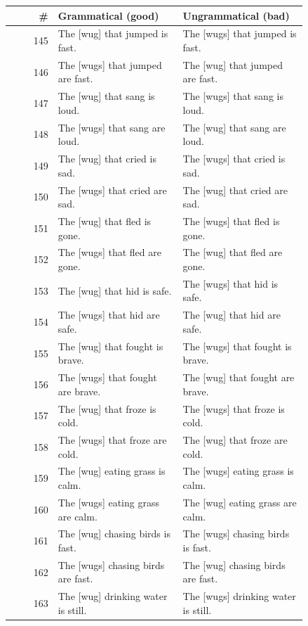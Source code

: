 \begin{table}[p]
\centering
\footnotesize
\begin{tabular}{@{}rp{0.42\linewidth}p{0.42\linewidth}@{}}
\hline
\# & Grammatical (good) & Ungrammatical (bad) \\
\hline
145 & The {[}wug{]} that jumped is fast. & The {[}wugs{]} that jumped is fast. \\
146 & The {[}wugs{]} that jumped are fast. & The {[}wug{]} that jumped are fast. \\
147 & The {[}wug{]} that sang is loud. & The {[}wugs{]} that sang is loud. \\
148 & The {[}wugs{]} that sang are loud. & The {[}wug{]} that sang are loud. \\
149 & The {[}wug{]} that cried is sad. & The {[}wugs{]} that cried is sad. \\
150 & The {[}wugs{]} that cried are sad. & The {[}wug{]} that cried are sad. \\
151 & The {[}wug{]} that fled is gone. & The {[}wugs{]} that fled is gone. \\
152 & The {[}wugs{]} that fled are gone. & The {[}wug{]} that fled are gone. \\
153 & The {[}wug{]} that hid is safe. & The {[}wugs{]} that hid is safe. \\
154 & The {[}wugs{]} that hid are safe. & The {[}wug{]} that hid are safe. \\
155 & The {[}wug{]} that fought is brave. & The {[}wugs{]} that fought is brave. \\
156 & The {[}wugs{]} that fought are brave. & The {[}wug{]} that fought are brave. \\
157 & The {[}wug{]} that froze is cold. & The {[}wugs{]} that froze is cold. \\
158 & The {[}wugs{]} that froze are cold. & The {[}wug{]} that froze are cold. \\
159 & The {[}wug{]} eating grass is calm. & The {[}wugs{]} eating grass is calm. \\
160 & The {[}wugs{]} eating grass are calm. & The {[}wug{]} eating grass are calm. \\
161 & The {[}wug{]} chasing birds is fast. & The {[}wugs{]} chasing birds is fast. \\
162 & The {[}wugs{]} chasing birds are fast. & The {[}wug{]} chasing birds are fast. \\
163 & The {[}wug{]} drinking water is still. & The {[}wugs{]} drinking water is still. \\

\end{tabular}
\end{table}
